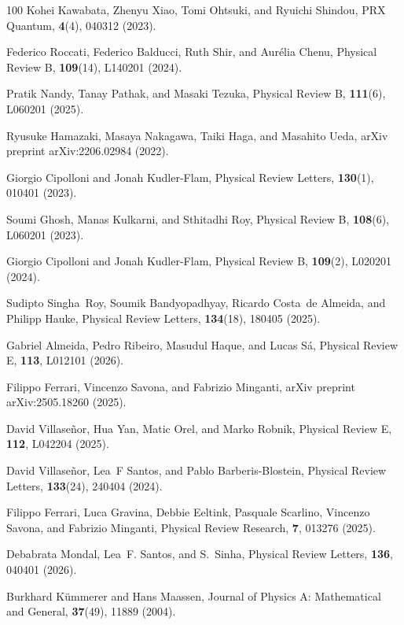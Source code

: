 \documentclass[preprint,pteplogo]{ptephy_v2}%
\numberwithin{equation}{section}
\theoremstyle{definition}
\begin{document}
\begin{thebibliography}{100}
Kohei Kawabata, Zhenyu Xiao, Tomi Ohtsuki, and Ryuichi Shindou, PRX Quantum, {\bf 4}(4), 040312 (2023).

Federico Roccati, Federico Balducci, Ruth Shir, and Aur{\'e}lia Chenu, Physical Review B, {\bf 109}(14), L140201 (2024).

Pratik Nandy, Tanay Pathak, and Masaki Tezuka, Physical Review B, {\bf 111}(6), L060201 (2025).

Ryusuke Hamazaki, Masaya Nakagawa, Taiki Haga, and Masahito Ueda, arXiv preprint arXiv:2206.02984 (2022).

Giorgio Cipolloni and Jonah Kudler-Flam, Physical Review Letters, {\bf 130}(1), 010401 (2023).

Soumi Ghosh, Manas Kulkarni, and Sthitadhi Roy, Physical Review B, {\bf 108}(6), L060201 (2023).

Giorgio Cipolloni and Jonah Kudler-Flam, Physical Review B, {\bf 109}(2), L020201 (2024).

Sudipto Singha~Roy, Soumik Bandyopadhyay, Ricardo Costa~de Almeida, and Philipp Hauke, Physical Review Letters, {\bf 134}(18), 180405 (2025).

Gabriel Almeida, Pedro Ribeiro, Masudul Haque, and Lucas S\'a, Physical Review E, {\bf 113}, L012101 (2026).

Filippo Ferrari, Vincenzo Savona, and Fabrizio Minganti, arXiv preprint arXiv:2505.18260 (2025).

David Villase\~nor, Hua Yan, Matic Orel, and Marko Robnik, Physical Review E, {\bf 112}, L042204 (2025).

David Villase{\~n}or, Lea~F Santos, and Pablo Barberis-Blostein, Physical Review Letters, {\bf 133}(24), 240404 (2024).

Filippo Ferrari, Luca Gravina, Debbie Eeltink, Pasquale Scarlino, Vincenzo Savona, and Fabrizio Minganti, Physical Review Research, {\bf 7}, 013276 (2025).

Debabrata Mondal, Lea~F. Santos, and S.~Sinha, Physical Review Letters, {\bf 136}, 040401 (2026).

Burkhard K{\"u}mmerer and Hans Maassen, Journal of Physics A: Mathematical and General, {\bf 37}(49), 11889 (2004).


\end{thebibliography}
\end{document}
